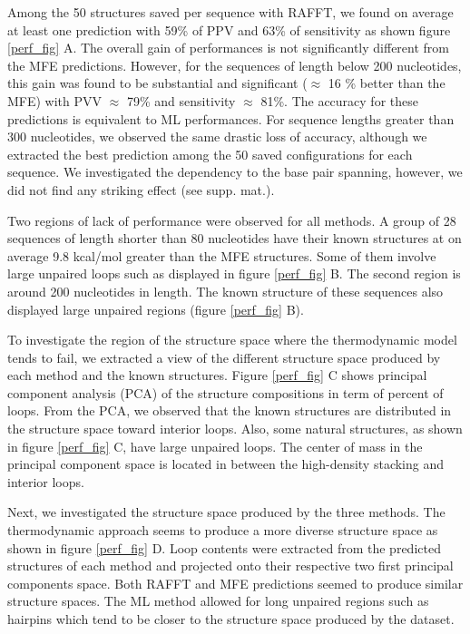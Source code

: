 \documentclass[a4paper,12pt]{article}
\begin{document}
Among the 50 structures saved per sequence with RAFFT, we found on average at
least one prediction with 59\% of PPV and 63\% of sensitivity as shown figure
\ref{perf_fig} A. The overall gain of performances is not significantly different
from the MFE predictions. However, for the sequences of length below 200
nucleotides, this gain was found to be substantial and significant (\(\approx\) 16 \%
better than the MFE) with PVV \(\approx\) 79\% and sensitivity \(\approx\) 81\%. The
accuracy for these predictions is equivalent to ML performances. For sequence
lengths greater than 300 nucleotides, we observed the same drastic loss of
accuracy, although we extracted the best prediction among the 50 saved
configurations for each sequence. We investigated the dependency to the base
pair spanning, however, we did not find any striking effect (see supp. mat.).

Two regions of lack of performance were observed for all methods. A group of 28
sequences of length shorter than 80 nucleotides have their known structures at
on average 9.8 kcal/mol greater than the MFE structures. Some of them involve
large unpaired loops such as displayed in figure \ref{perf_fig} B. The second
region is around 200 nucleotides in length. The known structure of these
sequences also displayed large unpaired regions (figure \ref{perf_fig} B).

To investigate the region of the structure space where the thermodynamic model
tends to fail, we extracted a view of the different structure space produced by
each method and the known structures. Figure \ref{perf_fig} C shows principal
component analysis (PCA) of the structure compositions in term of percent of
loops. From the PCA, we observed that the known structures are distributed in
the structure space toward interior loops. Also, some natural structures, as
shown in figure \ref{perf_fig} C, have large unpaired loops. The center of mass in
the principal component space is located in between the high-density stacking
and interior loops.

Next, we investigated the structure space produced by the three methods. The
thermodynamic approach seems to produce a more diverse structure space as shown
in figure \ref{perf_fig} D. Loop contents were extracted from the predicted
structures of each method and projected onto their respective two first
principal components space. Both RAFFT and MFE predictions seemed to produce
similar structure spaces. The ML method allowed for long unpaired regions such
as hairpins which tend to be closer to the structure space produced by the
dataset.
\end{document}

